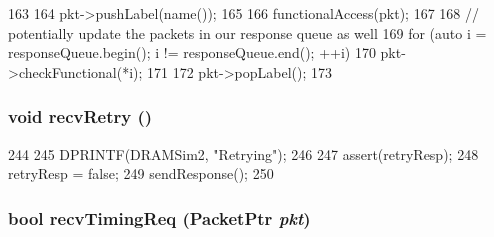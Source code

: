 \begin{DoxyCode}
163 {
164     pkt->pushLabel(name());
165 
166     functionalAccess(pkt);
167 
168     // potentially update the packets in our response queue as well
169     for (auto i = responseQueue.begin(); i != responseQueue.end(); ++i)
170         pkt->checkFunctional(*i);
171 
172     pkt->popLabel();
173 }
\end{DoxyCode}
\hypertarget{classDRAMSim2_a29cb5a4f98063ce6e9210eacbdb35298}{
\subsubsection[{recvRetry}]{\setlength{\rightskip}{0pt plus 5cm}void recvRetry ()}}
\label{classDRAMSim2_a29cb5a4f98063ce6e9210eacbdb35298}



\begin{DoxyCode}
244 {
245     DPRINTF(DRAMSim2, "Retrying\n");
246 
247     assert(retryResp);
248     retryResp = false;
249     sendResponse();
250 }
\end{DoxyCode}
\hypertarget{classDRAMSim2_a3344d9dd0f83257feab5424e761f31c6}{
\subsubsection[{recvTimingReq}]{\setlength{\rightskip}{0pt plus 5cm}bool recvTimingReq ({\bf PacketPtr} {\em pkt})}}
\label{classDRAMSim2_a3344d9dd0f83257feab5424e761f31c6}



